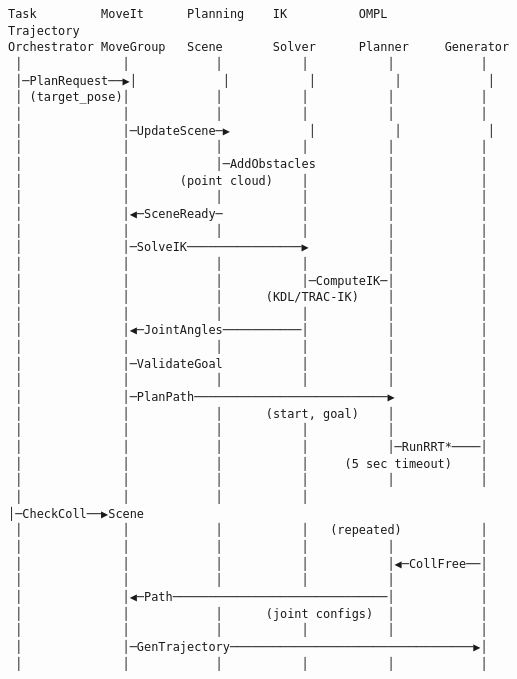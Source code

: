 \documentclass[
]{article}
\begin{document}
\begin{verbatim}
Task         MoveIt      Planning    IK          OMPL        Trajectory
Orchestrator MoveGroup   Scene       Solver      Planner     Generator
 │              │            │           │           │            │
 │─PlanRequest──▶│            │           │           │            │
 │ (target_pose)│            │           │           │            │
 │              │            │           │           │            │
 │              │─UpdateScene─▶           │           │            │
 │              │            │           │           │            │
 │              │            │─AddObstacles          │            │
 │              │       (point cloud)    │           │            │
 │              │            │           │           │            │
 │              │◀─SceneReady─           │           │            │
 │              │            │           │           │            │
 │              │─SolveIK────────────────▶           │            │
 │              │            │           │           │            │
 │              │            │           │─ComputeIK─│            │
 │              │            │      (KDL/TRAC-IK)    │            │
 │              │            │           │           │            │
 │              │◀─JointAngles───────────│           │            │
 │              │            │           │           │            │
 │              │─ValidateGoal           │           │            │
 │              │            │           │           │            │
 │              │─PlanPath───────────────────────────▶            │
 │              │            │      (start, goal)    │            │
 │              │            │           │           │            │
 │              │            │           │           │─RunRRT*────│
 │              │            │           │     (5 sec timeout)    │
 │              │            │           │           │            │
 │              │            │           │           │─CheckColl──▶Scene
 │              │            │           │   (repeated)           │
 │              │            │           │           │            │
 │              │            │           │           │◀─CollFree──│
 │              │            │           │           │            │
 │              │◀─Path──────────────────────────────│            │
 │              │            │      (joint configs)  │            │
 │              │            │           │           │            │
 │              │─GenTrajectory──────────────────────────────────▶│
 │              │            │           │           │            │

\end{verbatim}
\end{document}
